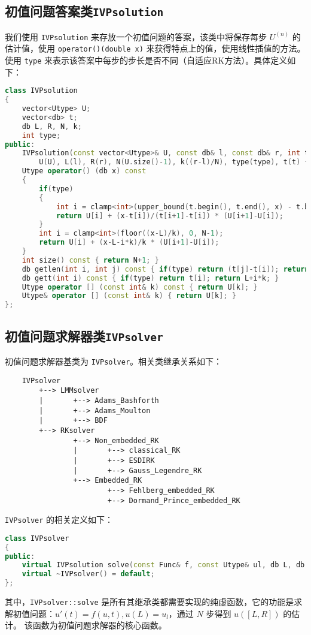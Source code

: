 \documentclass[lang=cn,a4paper,newtx,bibend=bibtex]{elegantpaper}
\begin{document}
\subsection{初值问题答案类\lstinline{IVPsolution}}
我们使用 \lstinline{IVPsolution} 来存放一个初值问题的答案，该类中将保存每步 $U^{(n)}$ 的估计值，使用 \lstinline{operator()(double x)} 来获得特点上的值，使用线性插值的方法。使用 \lstinline{type} 来表示该答案中每步的步长是否不同（自适应RK方法）。具体定义如下：
\begin{lstlisting}[language=C++]
class IVPsolution
{
    vector<Utype> U;
    vector<db> t;
    db L, R, N, k;
    int type;
public:
    IVPsolution(const vector<Utype>& U, const db& l, const db& r, int type = 0, const vector<db> t=vector<db>(0)):
        U(U), L(l), R(r), N(U.size()-1), k((r-l)/N), type(type), t(t) {}
    Utype operator() (db x) const
    {
        if(type)
        {
            int i = clamp<int>(upper_bound(t.begin(), t.end(), x) - t.begin() - 1, 0, N-1);
            return U[i] + (x-t[i])/(t[i+1]-t[i]) * (U[i+1]-U[i]);
        }
        int i = clamp<int>(floor((x-L)/k), 0, N-1);
        return U[i] + (x-L-i*k)/k * (U[i+1]-U[i]);
    }
    int size() const { return N+1; }
    db getlen(int i, int j) const { if(type) return (t[j]-t[i]); return (j-i)*k; }
    db gett(int i) const { if(type) return t[i]; return L+i*k; }
    Utype operator [] (const int& k) const { return U[k]; }
    Utype& operator [] (const int& k) { return U[k]; }
};
\end{lstlisting}

\subsection{初值问题求解器类\lstinline{IVPsolver}}
初值问题求解器基类为 \lstinline{IVPsolver}。相关类继承关系如下：
\begin{verbatim}
    IVPsolver
        +--> LMMsolver
        |       +--> Adams_Bashforth
        |       +--> Adams_Moulton
        |       +--> BDF
        +--> RKsolver
                +--> Non_embedded_RK
                |       +--> classical_RK
                |       +--> ESDIRK
                |       +--> Gauss_Legendre_RK
                +--> Embedded_RK
                        +--> Fehlberg_embedded_RK
                        +--> Dormand_Prince_embedded_RK
\end{verbatim}
\lstinline{IVPsolver} 的相关定义如下：
\begin{lstlisting}[language=C++]
class IVPsolver
{
public:
    virtual IVPsolution solve(const Func& f, const Utype& ul, db L, db R, int N) const = 0;
    virtual ~IVPsolver() = default;
};
\end{lstlisting}
其中，\lstinline{IVPsolver::solve} 是所有其继承类都需要实现的纯虚函数，它的功能是求解初值问题：$u'(t) = f(u, t), u(L)=u_l$，通过 $N$ 步得到 $u([L,R])$ 的估计。 该函数为初值问题求解器的核心函数。
\end{document}
